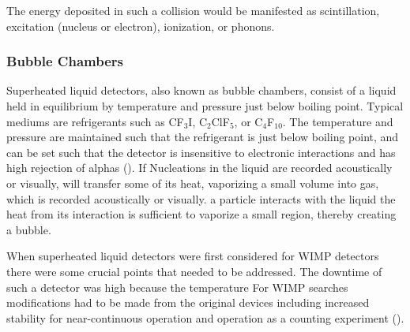 The
energy deposited in such a collision would be manifested as scintillation, excitation (nucleus or electron),
ionization, or phonons.

\subsubsection{Bubble Chambers} \label{subsubsec:bubbles}
Superheated liquid detectors, also known as bubble chambers, consist of a liquid held in equilibrium by temperature and
pressure just below boiling point.  Typical
mediums are refrigerants such as CF$_{3}$I, C$_{2}$ClF$_{5}$, or C$_{4}$F$_{10}$.  The temperature
and pressure are maintained such that the refrigerant is just below boiling point, and can be set such that
the detector is insensitive to electronic interactions and has high rejection of alphas
().  If Nucleations in the liquid are recorded acoustically or visually, 
will transfer some
of its heat, vaporizing a small volume into gas, which is recorded acoustically or visually.  
a particle interacts with the liquid the heat from its interaction is sufficient to vaporize a small region, thereby creating
a bubble.

When superheated liquid detectors were first considered for WIMP detectors there were some crucial points
that needed to be addressed.  The downtime of such a detector was high because the temperature
For WIMP searches modifications had to be made from the original
devices including increased stability for near-continuous operation and operation as a counting experiment
().

